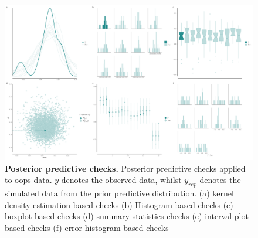 \documentclass[12pt,english, journal=jpr, layout=twocolumn]{article}
\begin{document}
\begin{figure}[h!]
	\centering
	\includegraphics[width =1\textwidth]{posteriorpredictivechecks.pdf}
	\caption{\textbf{Posterior predictive checks.} Posterior predictive checks applied to oops data. $y$ denotes the observed data, whilst $y_{rep}$ denotes the simulated data from the prior predictive distribution. (a) kernel density estimation based checks (b) Histogram based checks (c) boxplot based checks (d) summary statistics checks (e) interval plot based checks (f) error histogram based checks}
	\label{figure::figure3}
\end{figure}
\end{document}

